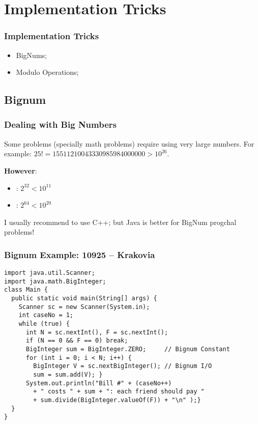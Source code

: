 
\section{Implementation Tricks}

\begin{frame}
  \frametitle{Implementation Tricks}
  \begin{itemize}
    \item BigNums;
    \item Modulo Operations;
  \end{itemize}
\end{frame}

\subsection{Bignum}
\begin{frame}
  \frametitle{Dealing with Big Numbers}

  Some problems (specially math problems) require using very large numbers.
  For example: $25! = 15511210043330985984000000 > 10^{26}$.\bigskip

  {\bf However}:
  \begin{itemize}
    \item {}: $2^{32} < 10^{11}$
    \item {}: $2^{64} < 10^{20}$
  \end{itemize}\bigskip


  \begin{block}{}
    I usually recommend to use C++; but Java is better for
    BigNum progchal problems!
  \end{block}
\end{frame}

\begin{frame}[fragile]
  \frametitle{Bignum Example: 10925 -- Krakovia}

  {\smaller
\begin{block}{}
\begin{verbatim}
import java.util.Scanner;
import java.math.BigInteger;
class Main {
  public static void main(String[] args) {
    Scanner sc = new Scanner(System.in);
    int caseNo = 1;
    while (true) {
      int N = sc.nextInt(), F = sc.nextInt();
      if (N == 0 && F == 0) break;
      BigInteger sum = BigInteger.ZERO;     // Bignum Constant
      for (int i = 0; i < N; i++) {
        BigInteger V = sc.nextBigInteger(); // Bignum I/O
        sum = sum.add(V); }
      System.out.println("Bill #" + (caseNo++)
        + " costs " + sum + ": each friend should pay "
        + sum.divide(BigInteger.valueOf(F)) + "\n" );}
  }
}
\end{verbatim}
  \end{block}}
\end{frame}


